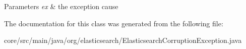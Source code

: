 \begin{DoxyParams}{Parameters}
{\em ex} & the exception cause \\
\hline
\end{DoxyParams}


The documentation for this class was generated from the following file\+:\begin{DoxyCompactItemize}
\item 
core/src/main/java/org/elasticsearch/Elasticsearch\+Corruption\+Exception.\+java\end{DoxyCompactItemize}
